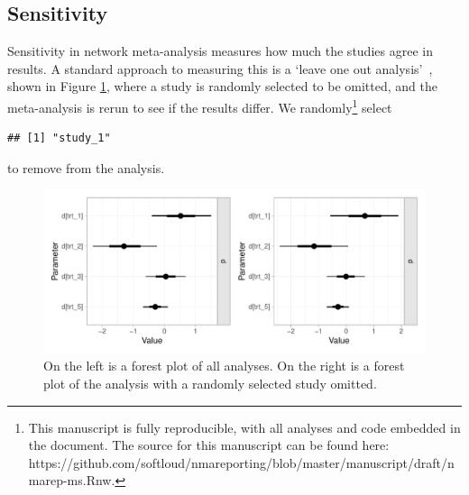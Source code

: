\documentclass[12pt]{article}\usepackage[]{graphicx}\usepackage[]{color}
\makeatletter
\def\maxwidth{ %
  \ifdim\Gin@nat@width>\linewidth
    \linewidth
  \else
    \Gin@nat@width
  \fi
}
\newenvironment{kframe}{%
 \def\at@end@of@kframe{}%
 \ifinner\ifhmode%
  \def\at@end@of@kframe{\end{minipage}}%
  \begin{minipage}{\columnwidth}%
 \fi\fi%
 \def\FrameCommand##1{\hskip\@totalleftmargin \hskip-\fboxsep
 \colorbox{shadecolor}{##1}\hskip-\fboxsep
     \hskip-\linewidth \hskip-\@totalleftmargin \hskip\columnwidth}%
 \MakeFramed {\advance\hsize-\width
   \@totalleftmargin\z@ \linewidth\hsize
   \@setminipage}}%
 {\par\unskip\endMakeFramed%
 \at@end@of@kframe}
\newenvironment{knitrout}{}{} %
\makeatother
\begin{document}
\subsection{Sensitivity}





Sensitivity in network meta-analysis measures how much the studies agree in results. A standard approach to measuring this is a `leave one out analysis'~\cite{borenstein_introduction_2011}, shown in Figure \ref{fig:one}, where a study is randomly selected to be omitted, and the meta-analysis is rerun to see if the results differ. We randomly\footnote{
This manuscript is fully reproducible, with all analyses and code embedded in the document. The source for this manuscript can be found here: https://github.com/softloud/nmareporting/blob/master/manuscript/draft/nmarep-ms.Rnw.
} select

\begin{knitrout}
\color{fgcolor}\begin{kframe}
\begin{verbatim}
## [1] "study_1"
\end{verbatim}
\end{kframe}
\end{knitrout}

to remove from the analysis.

\begin{figure}
\begin{knitrout}
\color{fgcolor}
\includegraphics[width=\maxwidth]{figure/forest-1} 

\end{knitrout}

\caption{On the left is a forest plot of all analyses. On the right is a forest plot of the analysis with a randomly selected study omitted.}
\label{fig:one}
\end{figure}
\end{document}
